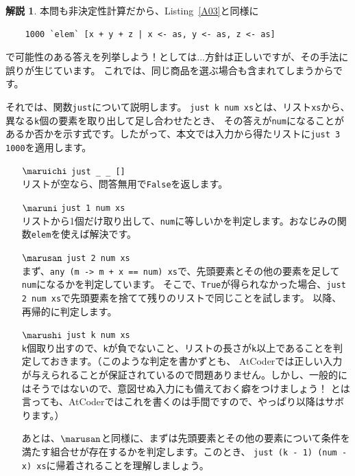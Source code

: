 \documentclass[12pt,a4paper,dvipdfmx,fleqn]{article}%
\theoremstyle{definition}
\theoremstyle{definition}
\newtheorem*{ans*}{解説}
\theoremstyle{definition}
\begin{document}
\begin{ans*}
    本問も非決定性計算だから、Listing~\ref{A03}と同様に
    \begin{verbatim}
    1000 `elem` [x + y + z | x <- as, y <- as, z <- as]
    \end{verbatim}
    \vspace*{-4mm}
    で可能性のある答えを列挙しよう！としては...方針は正しいですが、その手法に誤りが生じています。
    これでは、同じ商品を選ぶ場合も含まれてしまうからです。\par
    それでは、関数\texttt{just}について説明します。
    \texttt{just k num xs}とは、リスト\texttt{xs}から、異なる\texttt{k}個の要素を取り出して足し合わせたとき、
    その答えが\texttt{num}になることがあるか否かを示す式です。したがって、本文では入力から得たリストに\texttt{just 3 1000}を適用します。
    \begin{enumerate}
        \item [$\maruichi$] \texttt{just \_ \_ []}\\
            リストが空なら、問答無用で\texttt{False}を返します。
        \item [$\maruni$] \texttt{just 1 num xs}\\
            リストから1個だけ取り出して、\texttt{num}に等しいかを判定します。おなじみの関数\texttt{elem}を使えば解決です。
        \item [$\marusan$] \texttt{just 2 num xs}\\
            まず、\texttt{any (m -> m + x == num) xs}で、先頭要素とその他の要素を足して\texttt{num}になるかを判定しています。
            そこで、\texttt{True}が得られなかった場合、\texttt{just 2 num xs}で先頭要素を捨てて残りのリストで同じことを試します。
            以降、再帰的に判定します。
        \item [$\marushi$] \texttt{just k num xs}\\
            \texttt{k}個取り出すので、\texttt{k}が負でないこと、リストの長さが\texttt{k}以上であることを判定しておきます。（\chub このような判定を書かずとも、
            AtCoderでは正しい入力が与えられることが保証されているので問題ありません。しかし、一般的にはそうではないので、意図せぬ入力にも備えておく癖をつけましょう！
            とは言っても、AtCoderではこれを書くのは手間ですので、やっぱり以降はサボります。）\par
            あとは、$\marusan$と同様に、まずは先頭要素とその他の要素について条件を満たす組合せが存在するかを判定します。このとき、
            \texttt{just (k - 1) (num - x) xs}に帰着されることを理解しましょう。
    \end{enumerate}
\end{ans*}
\end{document}

